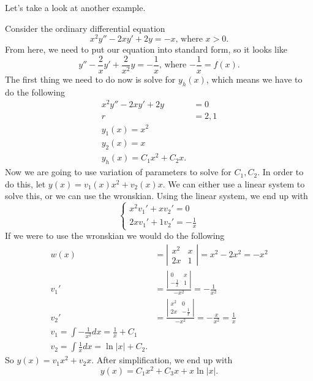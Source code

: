 Let's take a look at another example.
\begin{eg}
  Consider the ordinary differential equation 
  \[
    x^2y''-2xy'+2y=-x\text{, where }x>0
  .\] 
  From here, we need to put our equation into standard form, so it looks like 
  \[
    y''-\frac{2}{x}y'+\frac{2}{x^2}y=-\frac{1}{x}\text{, where $-\frac{1}{x}=f(x)$}
  .\] 
  The first thing we need to do now is solve for $y_h(x)$, which means we have to do the following
  \begin{align*}
    x^2y''-2xy'+2y&=0\\
    r&=2,1\\
    y_1(x)=x^2\\
    y_2(x)=x\\
    y_h(x)=C_1x^2+C_2x
  .\end{align*}
  Now we are going to use variation of parameters to solve for $C_1,C_2$. In order to do this, let $y(x)=v_1(x)x^2+v_2(x)x$. We can either use a linear system to solve this, or we can use the wronskian. Using the linear system, we end up with 
  \begin{equation*}
    \begin{cases}
      x^2v_1'+xv_2'=0\\
      2xv_1'+1v_2'=-\frac{1}{x}
    \end{cases}
  \end{equation*}
  If we were to use the wronskian we would do the following
  \begin{align*}
    w(x)&=\left| \begin{matrix} x^2&x\\2x&1 \end{matrix} \right| =x^2-2x^2=-x^2\\
    v_1'&= \frac{\left| \begin{matrix} 0&x\\-\frac{1}{x}&1 \end{matrix} \right| }{-x^2}=-\frac{1}{x^2}\\
    v_2'&=\frac{\left| \begin{matrix} x^2&0\\2x&-\frac{1}{x} \end{matrix} \right| }{-x^2}=-\frac{x}{x^2}=\frac{1}{x}\\
    v_1=\int-\frac{1}{x^2}dx=\frac{1}{x}+C_1\\
    v_2=\int \frac{1}{x}dx=\ln|x|+C_2
  .\end{align*}
  So $y(x)=v_1x^2+v_2x$. After simplification, we end up with 
  \[
    y(x)=C_1x^2+C_3x+x\ln|x|
  .\] 
\end{eg}

